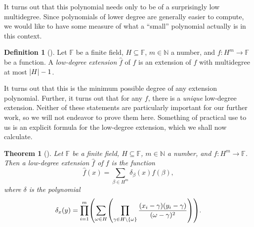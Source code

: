 \documentclass[english,12pt]{reedthesis}
\theoremstyle{plain}
\newtheorem{thm}{Theorem}[section]
\theoremstyle{definition}
\newtheorem{defn}[defn]{Definition}
\theoremstyle{remark}
\DeclarePairedDelimiter{\abs}{\lvert}{\rvert}
\begin{document}
It turns out that this polynomial needs only to be of a surprisingly low
multidegree. Since polynomials of lower degree are generally easier to compute,
we would like to have some measure of what a ``small'' polynomial actually is in
this context.

\begin{defn}[{\cite[]{CFGS22}}]\label{def:low-deg-ext}
  Let $\mathbb{F}$ be a finite field, $H \subseteq \mathbb{F}$, $m \in \mathbb{N}$ a number, and
  $f: H^{m} \rightarrow \mathbb{F}$ be a function. A \emph{low-degree extension} $\hat{f}$
  of $f$ is an extension of $f$ with multidegree at most $\abs{H} - 1$.
\end{defn}

It turns out that this is the minimum possible degree of any extension
polynomial. Further, it turns out that for any $f$, there is a \emph{unique}
low-degree extension. Neither of these statements are particularly important for
our further work, so we will not endeavor to prove them here. Something of
practical use to us is an explicit formula for the low-degree extension, which
we shall now calculate.

\begin{thm}[{\cite[]{CFGS22}}]\label{thm:low-deg-ext-exists}
  Let $\mathbb{F}$ be a finite field, $H \subseteq \mathbb{F}$, $m \in \mathbb{N}$ a number, and
  $f: H^{m} \rightarrow \mathbb{F}$. Then a low-degree extension $\hat{f}$ of $f$ is the
  function
  \begin{equation}
    \hat{f}(x) = \sum_{\beta \in H^{m}}\delta_{\beta}(x)f(\beta),
  \end{equation}
  where $\delta$ is the polynomial
  \begin{equation}\label{eqn:delta-poly}
    \delta_{x}(y) = \prod_{i = 1}^{m}\mleft(\sum_{\omega \in H}\mleft(
        \prod_{\gamma \in H \setminus \{\omega\}}\frac{(x_{i} - \gamma)(y_{i} - \gamma)}{(\omega - \gamma)^{2}}
      \mright)\mright).
  \end{equation}
\end{thm}
\end{document}
